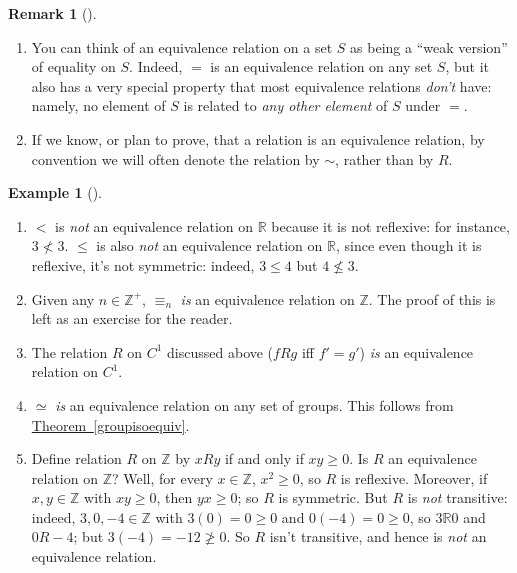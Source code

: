 \documentclass[10pt,]{book}
\theoremstyle{plain}
\theoremstyle{definition}
\theoremstyle{definition}
\newtheorem{remark}[theorem]{Remark}
\theoremstyle{definition}
\newtheorem{example}[theorem]{Example}
\theoremstyle{definition}
\numberwithin{equation}{section}
\def\Z{\mathbb{Z}}
\def\R{\mathbb{R}}
\newcommand{\lt}{<}
\begin{document}
\begin{remark}[]\label{remark-33}
\leavevmode%
\begin{enumerate}
\item\hypertarget{li-384}{}You can think of an equivalence relation on a set \(S\) as being a ``weak version'' of equality on \(S\).  Indeed, \(=\) is an equivalence relation on any set \(S\), but it also has a very special property that most equivalence relations \emph{don't} have: namely, no element of \(S\) is related to \emph{any other element} of \(S\) under \(=\).%
\item\hypertarget{li-385}{}If we know, or plan to prove, that a relation is an equivalence relation, by convention we will often denote the relation by \(\sim\), rather than by \(R\).%
\end{enumerate}
\end{remark}
\begin{example}[]\label{example-65}
\leavevmode%
\begin{enumerate}
\item\hypertarget{li-386}{}\(\lt\) is \emph{not} an equivalence relation on \(\R\) because it is not reflexive: for instance, \(3\not\lt  3\). \(\leq\) is also \emph{not} an equivalence relation on \(\R\), since even though it is reflexive, it's not symmetric: indeed, \(3\leq 4\) but \(4\not\leq 3\).%
\item\hypertarget{li-387}{}Given any \(n\in \Z^+\), \(\equiv_n\) \emph{is} an equivalence relation on \(\Z\).  The proof of this is left as an exercise for the reader.%
\item\hypertarget{li-388}{}The relation \(R\) on \(C^1\) discussed above (\(fR  g\) iff \(f'=g'\)) \emph{is} an equivalence relation on \(C^1\).%
\item\hypertarget{li-389}{}\(\simeq\) \emph{is} an equivalence relation on any set of groups. This follows from \hyperref[groupisoequiv]{Theorem~\ref{groupisoequiv}}.%
\item\hypertarget{li-390}{}Define relation \(R\) on \(\Z\) by \(xR y\) if and only if \(xy
\geq 0\).  Is \(R\) an equivalence relation on \(\Z\)?  Well, for every \(x\in \Z\), \(x^2\geq 0\), so \(R\) is reflexive.  Moreover, if \(x,y\in
\Z\) with \(xy \geq 0\), then \(yx \geq 0\); so \(R\) is symmetric.  But \(R\) is \emph{not} transitive: indeed, \(3,0,-4\in \Z\) with \(3(0)=0
\geq 0\) and \(0(-4)=0\geq 0\), so \(3\R 0\) and \(0 R -4\); but \(3(-4)=-12 \not \geq 0\).  So \(R\) isn't transitive, and hence is \emph{not} an equivalence relation.%
\end{enumerate}
\end{example}
\end{document}
